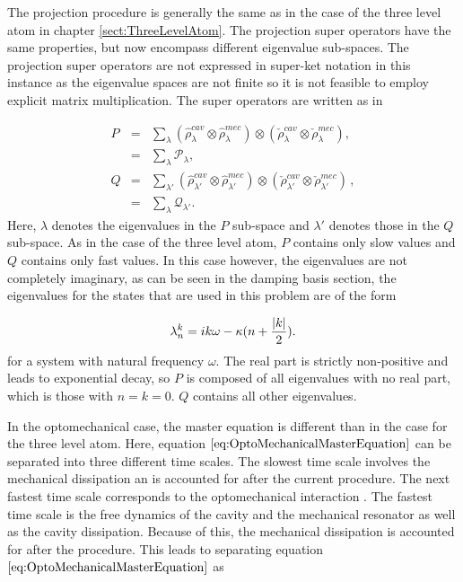 \documentclass[12pt]{article}
\begin{document}
The projection procedure is generally the same as in the case of the three level atom in chapter \ref{sect:ThreeLevelAtom}. The projection super operators have the same properties, but now encompass different eigenvalue sub-spaces. The projection super operators are not expressed in super-ket notation in this instance as the eigenvalue spaces are not finite so it is not feasible to employ explicit matrix multiplication. The super operators are written as in \cite{YanesOptomechanicalCooling2020}

\begin{eqnarray}\label{eq:optomechanical_projectors_detailed}
  P &=& \sum_{\lambda} (\hat{\rho}_{\lambda}^{cav}\otimes\hat{\rho}_{\lambda}^{mec})\otimes(\check{\rho}_{\lambda}^{cav}\otimes\check{\rho}_{\lambda}^{mec}),\label{eq:projector_p}\\
  &=& \sum_\lambda \mathcal{P}_\lambda, \nonumber\\
  Q &=& \sum_{\lambda'} (\hat{\rho}_{\lambda'}^{cav}\otimes \hat{\rho}_{\lambda'}^{mec})\otimes(\check{\rho}_{\lambda'}^{cav}\otimes\check{\rho}_{\lambda'}^{mec})\label{eq:projector_q}\, ,\\
  &=& \sum_\lambda \mathcal{Q}_{\lambda'}. \nonumber
\end{eqnarray} Here, $\lambda$ denotes the eigenvalues in the $P$ sub-space and $\lambda'$ denotes those in the $Q$ sub-space. As in the case of the three level atom, $P$ contains only slow values and $Q$ contains only fast values. In this case however, the eigenvalues are not completely imaginary, as can be seen in the damping basis section, the eigenvalues for the states that are used in this problem are of the form

\begin{equation}
    \lambda_n^k=ik\omega-\kappa (n+\frac{\abs{k}}{2}).
\end{equation} for a system with natural frequency $\omega$. The real part is strictly non-positive and leads to exponential decay, so $P$ is composed of all eigenvalues with no real part, which is those with $n=k=0$. $Q$ contains all other eigenvalues. 

In the optomechanical case, the master equation is different than in the case for the three level atom. Here, equation $\eqref{eq:OptoMechanicalMasterEquation}$ can be separated into three different time scales. The slowest time scale involves the mechanical dissipation an is accounted for after the current procedure. The next fastest time scale corresponds to the optomechanical interaction . The fastest time scale is the free dynamics of the cavity and the mechanical resonator as well as the cavity dissipation. Because of this, the mechanical dissipation is accounted for after the procedure. This leads to separating equation $\eqref{eq:OptoMechanicalMasterEquation}$ as
\end{document}
